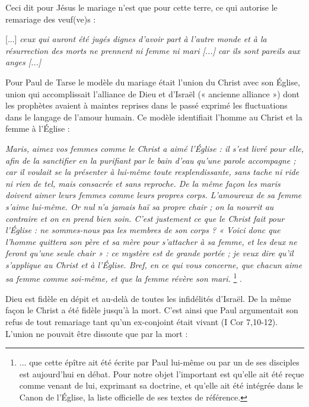  Ceci dit pour Jésus le mariage n'est que pour cette terre, ce qui autorise le remariage des veuf(ve)s :

\begin{displayquote}[Luc 20, 34-36]

[...] \emph{ceux qui auront été jugés dignes d'avoir part à l'autre monde et à la résurrection des morts ne prennent ni femme ni mari \emph{[...]} car ils sont pareils aux anges \emph{[...]}}
\end{displayquote}

 Pour Paul de Tarse le modèle du mariage était l'union du Christ avec son Église, union qui accomplissait l'alliance de Dieu et d'Israël (« ancienne alliance ») dont les prophètes avaient à maintes reprises dans le passé exprimé les fluctuations dans le langage de l'amour humain. Ce modèle identifiait l'homme au Christ et la femme à l'Église :

\begin{displayquote}[Eph. 5,25-33]
\emph{Maris, aimez vos femmes comme le Christ a aimé l'Église : il s'est livré pour elle, afin de la sanctifier en la purifiant par le bain d'eau qu'une parole accompagne ; car il voulait se la présenter à lui-même toute resplendissante, sans tache ni ride ni rien de tel, mais consacrée et sans reproche. De la même façon les maris doivent aimer leurs femmes comme leurs propres corps. L'amoureux de sa femme s'aime lui-même. Or nul n'a jamais haï sa propre chair ; on la nourrit au contraire et on en prend bien soin. C'est justement ce que le Christ fait pour l'Église : ne sommes-nous pas les membres de son corps ? « Voici donc que l'homme quittera son père et sa mère pour s'attacher à sa femme, et les deux ne feront qu'une seule chair » : ce mystère est de grande portée ; je veux dire qu'il s'applique au Christ et à l'Église. Bref, en ce qui vous concerne, que chacun aime sa femme comme soi-même, et que la femme révère son mari.}
\footnote{... que cette épître ait été écrite par Paul lui-même ou par un de ses disciples est aujourd'hui en débat. Pour notre objet l'important est qu'elle ait été reçue comme venant de lui, exprimant sa doctrine, et qu'elle ait été intégrée dans le Canon de l'Église, la liste officielle de ses textes de référence.}%
.
\end{displayquote}

 Dieu est fidèle en dépit et au-delà de toutes les infidélités d'Israël. De la même façon le Christ a été fidèle jusqu'à la mort. C'est ainsi que Paul argumentait son refus de tout remariage tant qu'un ex-conjoint était vivant (I Cor 7,10-12). L'union ne pouvait être dissoute que par la mort :

